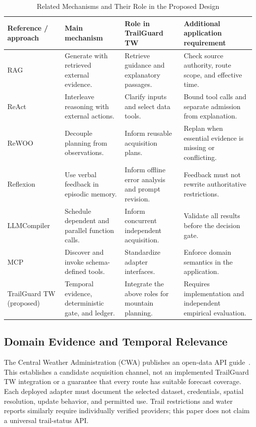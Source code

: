\documentclass[conference]{IEEEtran}
\begin{document}
\begin{table}[t]
\caption{Related Mechanisms and Their Role in the Proposed Design}
\label{tab:related}
\centering\footnotesize
\begin{tabular}{@{}p{}p{}p{}p{}@{}}
\toprule
Reference / approach & Main mechanism & Role in TrailGuard TW & Additional application requirement\\
\midrule
RAG~\cite{rag} & Generate with retrieved external evidence. & Retrieve guidance and explanatory passages. & Check source authority, route scope, and effective time.\\
ReAct~\cite{react} & Interleave reasoning with external actions. & Clarify inputs and select data tools. & Bound tool calls and separate admission from explanation.\\
ReWOO~\cite{rewoo} & Decouple planning from observations. & Inform reusable acquisition plans. & Replan when essential evidence is missing or conflicting.\\
Reflexion~\cite{reflexion} & Use verbal feedback in episodic memory. & Inform offline error analysis and prompt revision. & Feedback must not rewrite authoritative restrictions.\\
LLMCompiler~\cite{llmcompiler} & Schedule dependent and parallel function calls. & Inform concurrent independent acquisition. & Validate all results before the decision gate.\\
MCP~\cite{mcp} & Discover and invoke schema-defined tools. & Standardize adapter interfaces. & Enforce domain semantics in the application.\\
TrailGuard TW (proposed) & Temporal evidence, deterministic gate, and ledger. & Integrate the above roles for mountain planning. & Requires implementation and independent empirical evaluation.\\
\bottomrule
\end{tabular}
\end{table}

\subsection{Domain Evidence and Temporal Relevance}
The Central Weather Administration (CWA) publishes an open-data API guide~\cite{cwa}. This establishes a candidate acquisition channel, not an implemented TrailGuard TW integration or a guarantee that every route has suitable forecast coverage. Each deployed adapter must document the selected dataset, credentials, spatial resolution, update behavior, and permitted use. Trail restrictions and water reports similarly require individually verified providers; this paper does not claim a universal trail-status API.
\end{document}
